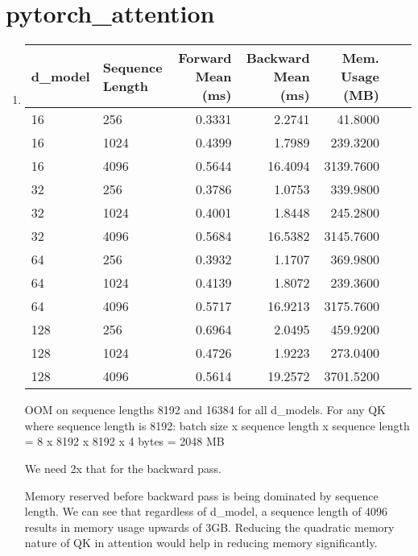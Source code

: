 \documentclass{article}
\begin{document}
\section{pytorch\_attention}
\begin{enumerate}
\item
\begin{table}[h!]
\centering
\label{tab:benchmark}
\begin{tabular}{llrrrrr}
\toprule
d\_model & Sequence Length & Forward Mean (ms) & Backward Mean (ms) & Mem. Usage (MB) \\
\midrule
16 & 256 & 0.3331 & 2.2741 & 41.8000 \\
16 & 1024 & 0.4399 & 1.7989 & 239.3200 \\
16 & 4096 & 0.5644 & 16.4094 & 3139.7600 \\
32 & 256 & 0.3786 & 1.0753 & 339.9800 \\
32 & 1024 & 0.4001 & 1.8448 & 245.2800 \\
32 & 4096 & 0.5684 & 16.5382 & 3145.7600 \\
64 & 256 & 0.3932 & 1.1707 & 369.9800 \\
64 & 1024 & 0.4139 & 1.8072 & 239.3600 \\
64 & 4096 & 0.5717 & 16.9213 & 3175.7600 \\
128 & 256 & 0.6964 & 2.0495 & 459.9200 \\
128 & 1024 & 0.4726 & 1.9223 & 273.0400 \\
128 & 4096 & 0.5614 & 19.2572 & 3701.5200 \\
\bottomrule
\end{tabular}
\end{table}
OOM on sequence lengths 8192 and 16384 for all d\_models.
For any QK where sequence length is 8192:
  batch size x sequence length x sequence length = 8 x 8192 x 8192 x 4 bytes = 2048 MB

We need 2x that for the backward pass.

Memory reserved before backward pass is being dominated by sequence length. We can see that regardless of d\_model, a sequence length of 4096 results in memory usage upwards of 3GB. Reducing the quadratic memory nature of QK in attention would help in reducing memory significantly.

\end{enumerate}

\newpage
\end{document}
